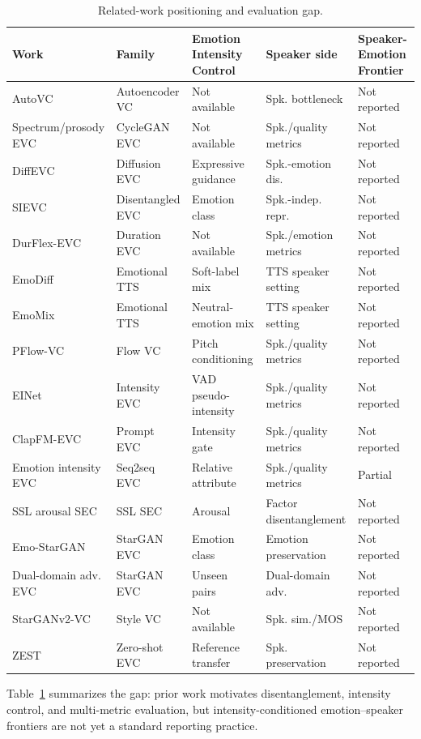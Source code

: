 \begin{table}[t]
\caption{Related-work positioning and evaluation gap.}
\label{tab:related-work-gap}
\centering
\scriptsize
\setlength{\tabcolsep}{2.6pt}
\begin{tabular*}{\textwidth}{@{\extracolsep{\fill}}lllll@{}}
\toprule
Work & Family & Emotion Intensity Control & Speaker side & Speaker-Emotion Frontier \\
\midrule
AutoVC \cite{qian2019autovc} & Autoencoder VC & Not available & Spk. bottleneck & Not reported \\
Spectrum/prosody EVC \cite{zhou2020transforming} & CycleGAN EVC & Not available & Spk./quality metrics & Not reported \\
DiffEVC \cite{chou2024diffevc} & Diffusion EVC & Expressive guidance & Spk.-emotion dis. & Not reported \\
SIEVC \cite{chen2022sievc} & Disentangled EVC & Emotion class & Spk.-indep. repr. & Not reported \\
DurFlex-EVC \cite{oh2025durflexevc} & Duration EVC & Not available & Spk./emotion metrics & Not reported \\
EmoDiff \cite{guo2023emodiff} & Emotional TTS & Soft-label mix & TTS speaker setting & Not reported \\
EmoMix \cite{tang2023emomix} & Emotional TTS & Neutral-emotion mix & TTS speaker setting & Not reported \\
PFlow-VC \cite{zuo2025pflowvc} & Flow VC & Pitch conditioning & Spk./quality metrics & Not reported \\
EINet \cite{qi2024einet} & Intensity EVC & VAD pseudo-intensity & Spk./quality metrics & Not reported \\
ClapFM-EVC \cite{pan2025clapfmevc} & Prompt EVC & Intensity gate & Spk./quality metrics & Not reported \\
Emotion intensity EVC \cite{zhou2023emotionintensity} & Seq2seq EVC & Relative attribute & Spk./quality metrics & Partial \\
SSL arousal SEC \cite{prabhu2023inthewildsec} & SSL SEC & Arousal & Factor disentanglement & Not reported \\
Emo-StarGAN \cite{ghosh2023emostargan} & StarGAN EVC & Emotion class & Emotion preservation & Not reported \\
Dual-domain adv. EVC \cite{shah2023evcusep} & StarGAN EVC & Unseen pairs & Dual-domain adv. & Not reported \\
StarGANv2-VC \cite{li2021starganv2vc} & Style VC & Not available & Spk. sim./MOS & Not reported \\
ZEST \cite{dutta2024zest} & Zero-shot EVC & Reference transfer & Spk. preservation & Not reported \\
\bottomrule
\end{tabular*}
\setlength{\tabcolsep}{6pt}
\end{table}

Table~\ref{tab:related-work-gap} summarizes the gap: prior work motivates disentanglement, intensity control, and multi-metric evaluation, but intensity-conditioned emotion--speaker frontiers are not yet a standard reporting practice.
